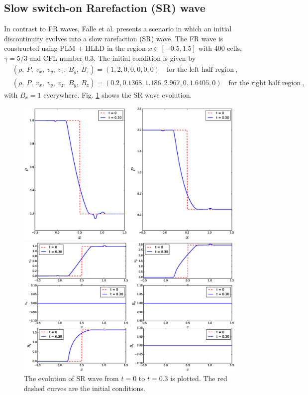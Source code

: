 \documentclass[10.5pt]{article}
\begin{document}
\subsection{Slow switch-on Rarefaction (SR) wave}
In contrast to FR waves, Falle et al.\cite{falle1998} presents a scenario in which 
an initial discontinuity evolves into a slow rarefaction (SR) wave.
The FR wave is constructed using PLM + HLLD in the region $x\in[-0.5,1.5]$ with 400 cells, 
$\gamma=5/3$ and CFL number 0.3.
The initial condition is given by 
\begin{align}
	&(\rho,\ P,\ v_x,\ v_y,\ v_z,\ B_y,\ B_z) = (1,2,0,0,0,0,0) \quad
	\text{for the left half region}  \ , \\
	&(\rho,\ P,\ v_x,\ v_y,\ v_z,\ B_y,\ B_z) = (0.2,0.1368,1.186,2.967,0,1.6405,0) \quad
	\text{for the right half region}  \ , 
\end{align}
with $B_x = 1$ everywhere. 
Fig. \ref{fig: SR test} shows the SR wave evolution.
\begin{figure}[ht]
	\centering
	\begin{minipage}[c]{0.9\textwidth}
		\includegraphics[width=1\textwidth]{SR1.eps}
	\end{minipage}
	\begin{minipage}[c]{0.9\textwidth}
		\includegraphics[width=1\textwidth]{SR2.eps}
	\end{minipage}%
\caption{The evolution of SR wave from $t=0$ to $t=0.3$ is plotted. 
The red dashed curves are the initial conditions.}
\label{fig: SR test}
\end{figure}
\end{document}
